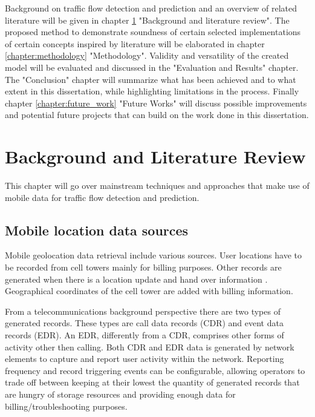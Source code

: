 \documentclass[12pt, a4paper]{report}
\theoremstyle{definition}
\theoremstyle{definition}%
\theoremstyle{definition}%
\theoremstyle{definition}%
\theoremstyle{definition}%
\theoremstyle{definition}%
\begin{document}
 Background on traffic flow detection and prediction and an overview of related literature will be given in chapter \ref{chapter:background} "Background and literature review". The proposed method to demonstrate soundness of certain selected implementations of certain concepts inspired by literature will be elaborated in chapter \ref{chapter:methodology} "Methodology".  Validity and versatility of the created model will be evaluated and discussed in the "Evaluation and Results" chapter.  The "Conclusion" chapter will summarize what has been achieved and to what extent in this dissertation, while highlighting limitations in the process. Finally chapter  \ref{chapter:future_work} "Future Works"  will discuss possible improvements and potential future projects that can build on the work done in this dissertation.



\chapter{Background and Literature Review} \label{chapter:background}

This chapter will go over mainstream techniques and approaches that make use of mobile data for traffic flow detection and prediction.

\section{Mobile location data sources} \label{background_mobile_location_data_sources} 

Mobile geolocation data retrieval include various sources. User locations have to be recorded from cell towers mainly for billing purposes. Other records are generated when there is a location update and hand over information \cite{Calabrese2011}. Geographical coordinates of the cell tower are added with billing information. 

From a telecommunications background perspective there are two types of generated records.  These types are call data records (CDR) and event data records (EDR). An EDR, differently from a CDR, comprises other forms of activity other then calling. Both CDR and EDR data is generated by network elements to capture and report user activity within the network. Reporting frequency and record triggering events can be configurable, allowing operators to trade off between keeping at their lowest the quantity of generated records that are hungry of storage resources and providing enough data for billing/troubleshooting purposes.
\end{document}

